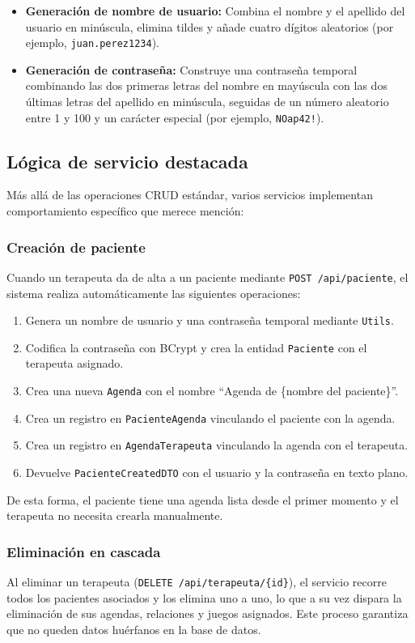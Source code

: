 \begin{itemize}
    \item \textbf{Generación de nombre de usuario:} Combina el nombre y el apellido del usuario en minúscula, elimina tildes y añade cuatro dígitos aleatorios (por ejemplo, \texttt{juan.perez1234}).
    \item \textbf{Generación de contraseña:} Construye una contraseña temporal combinando las dos primeras letras del nombre en mayúscula con las dos últimas letras del apellido en minúscula, seguidas de un número aleatorio entre 1 y 100 y un carácter especial (por ejemplo, \texttt{NOap42!}).
\end{itemize}

\subsection{Lógica de servicio destacada}
Más allá de las operaciones CRUD estándar, varios servicios implementan comportamiento específico que merece mención:

\subsubsection{Creación de paciente}
Cuando un terapeuta da de alta a un paciente mediante \texttt{POST /api/paciente}, el sistema realiza automáticamente las siguientes operaciones:
\begin{enumerate}
    \item Genera un nombre de usuario y una contraseña temporal mediante \texttt{Utils}.
    \item Codifica la contraseña con BCrypt y crea la entidad \texttt{Paciente} con el terapeuta asignado.
    \item Crea una nueva \texttt{Agenda} con el nombre ``Agenda de \{nombre del paciente\}''.
    \item Crea un registro en \texttt{PacienteAgenda} vinculando el paciente con la agenda.
    \item Crea un registro en \texttt{AgendaTerapeuta} vinculando la agenda con el terapeuta.
    \item Devuelve \texttt{PacienteCreatedDTO} con el usuario y la contraseña en texto plano.
\end{enumerate}
De esta forma, el paciente tiene una agenda lista desde el primer momento y el terapeuta no necesita crearla manualmente.

\subsubsection{Eliminación en cascada}
Al eliminar un terapeuta (\texttt{DELETE /api/terapeuta/\{id\}}), el servicio recorre todos los pacientes asociados y los elimina uno a uno, lo que a su vez dispara la eliminación de sus agendas, relaciones y juegos asignados. Este proceso garantiza que no queden datos huérfanos en la base de datos.

